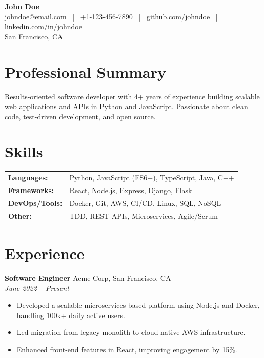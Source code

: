 \documentclass[11pt,a4paper]{article}
\begin{document}
\begin{center}
    {\LARGE\bfseries John Doe}\\
    \vspace{2mm}
    \href{mailto:johndoe@email.com}{johndoe@email.com} ~|~
    +1-123-456-7890 ~|~
    \href{https://github.com/johndoe}{github.com/johndoe} ~|~
    \href{https://linkedin.com/in/johndoe}{linkedin.com/in/johndoe}\\
    San Francisco, CA
\end{center}

\vspace{6pt}

\section*{Professional Summary}
Results-oriented software developer with 4+ years of experience building scalable web applications and APIs in Python and JavaScript. Passionate about clean code, test-driven development, and open source.

\section*{Skills}
\begin{tabular}{ l l }
  \textbf{Languages:}     & Python, JavaScript (ES6+), TypeScript, Java, C++ \\
  \textbf{Frameworks:}    & React, Node.js, Express, Django, Flask \\
  \textbf{DevOps/Tools:}  & Docker, Git, AWS, CI/CD, Linux, SQL, NoSQL \\
  \textbf{Other:}         & TDD, REST APIs, Microservices, Agile/Scrum \\
\end{tabular}

\section*{Experience}

\textbf{Software Engineer} \hfill Acme Corp, San Francisco, CA \\
\textit{June 2022 -- Present}
\vspace{-6pt}
\begin{itemize}[leftmargin=*,noitemsep]
    \item Developed a scalable microservices-based platform using Node.js and Docker, handling 100k+ daily active users.
    \item Led migration from legacy monolith to cloud-native AWS infrastructure.
    \item Enhanced front-end features in React, improving engagement by 15\%.
\end{itemize}
\end{document}
